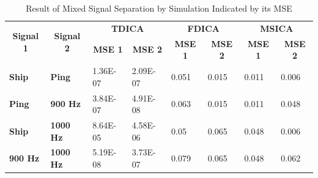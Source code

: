 \documentclass[a4paper]{jpconf}
\begin{document}
\begin{table}[h]
\centering
\caption{Result of Mixed Signal Separation by Simulation Indicated by its MSE}
\label{table:comparison}
\begin{tabular}{|l|l|l|l|l|l|l|l|}
\hline
\multicolumn{1}{|c|}{\multirow{2}{*}{\textbf{Signal 1}}} & \multicolumn{1}{c|}{\multirow{2}{*}{\textbf{Signal 2}}} & \multicolumn{2}{c|}{\textbf{TDICA}}                                       & \multicolumn{2}{c|}{\textbf{FDICA}}                                       & \multicolumn{2}{c|}{\textbf{MSICA}}                                       \\ \cline{3-8} 
\multicolumn{1}{|c|}{}                                   & \multicolumn{1}{c|}{}                                   & \multicolumn{1}{c|}{\textbf{MSE 1}} & \multicolumn{1}{c|}{\textbf{MSE 2}} & \multicolumn{1}{c|}{\textbf{MSE 1}} & \multicolumn{1}{c|}{\textbf{MSE 2}} & \multicolumn{1}{c|}{\textbf{MSE 1}} & \multicolumn{1}{c|}{\textbf{MSE 2}} \\ \hline
\textbf{Ship}                                            & \textbf{Ping}                                           & 1.36E-07                            & 2.09E-07                            & 0.051                               & 0.015                               & 0.011                               & 0.006                               \\ \hline
\textbf{Ping}                                            & \textbf{900 Hz}                                         & 3.84E-07                            & 4.91E-08                            & 0.063                               & 0.015                               & 0.011                               & 0.048                               \\ \hline
\textbf{Ship}                                            & \textbf{1000 Hz}                                        & 8.64E-05                            & 4.58E-06                            & 0.05                                & 0.065                               & 0.048                               & 0.006                               \\ \hline
\textbf{900 Hz}                                          & \textbf{1000 Hz}                                        & 5.19E-08                            & 3.73E-07                            & 0.079                               & 0.065                               & 0.048                               & 0.062                               \\ \hline

\end{tabular}
\end{table}
\end{document}
